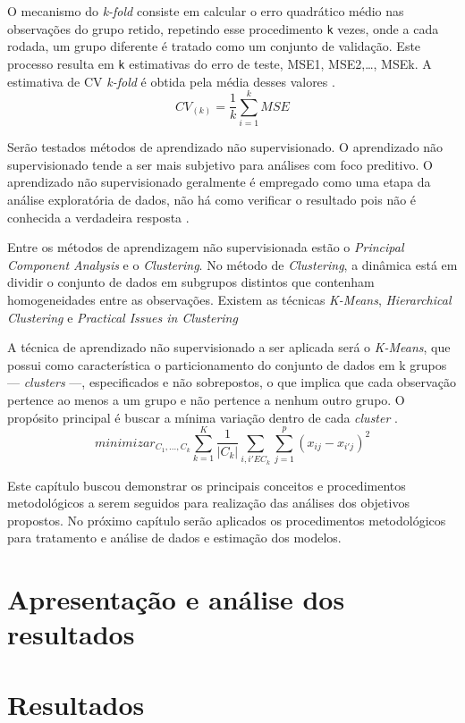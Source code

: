\documentclass[12pt,12pt,openright,oneside,a4paper,chapter=TITLE,section=TITLE,subsection=TITLE,subsubsection=TITLE,english,french,spanish,portugues,sumario=tradicional]{abntex2}
\begin{document}
O mecanismo do \emph{k-fold} consiste em calcular o erro quadrático médio nas observações do grupo retido, repetindo esse procedimento \texttt{k} vezes, onde a cada rodada, um grupo diferente é tratado como um conjunto de validação. Este processo resulta em \texttt{k} estimativas do erro de teste, MSE1, MSE2,\ldots{}, MSEk. A estimativa de CV \emph{k-fold} é obtida pela média desses valores \cite{gareth:2017}.
\[
CV_{(k)} = \frac{1}{k}\sum_{i=1}^{k}MSE  
\]

Serão testados métodos de aprendizado não supervisionado. O aprendizado não supervisionado tende a ser mais subjetivo para análises com foco preditivo. O aprendizado não supervisionado geralmente é empregado como uma etapa da análise exploratória de dados, não há como verificar o resultado pois não é conhecida a verdadeira resposta \cite{gareth:2017}.

Entre os métodos de aprendizagem não supervisionada estão o \emph{Principal Component Analysis} e o \emph{Clustering}. No método de \emph{Clustering}, a dinâmica está em dividir o conjunto de dados em subgrupos distintos que contenham homogeneidades entre as observações. Existem as técnicas \emph{K-Means}, \emph{Hierarchical Clustering} e \emph{Practical Issues in Clustering} \cite{gareth:2017}

A técnica de aprendizado não supervisionado a ser aplicada será o \emph{K-Means}, que possui como característica o particionamento do conjunto de dados em k grupos --- \emph{clusters} ---, especificados e não sobrepostos, o que implica que cada observação pertence ao menos a um grupo e não pertence a nenhum outro grupo. O propósito principal é buscar a mínima variação dentro de cada \emph{cluster} \cite{gareth:2017}.
\[
minimizar_{C_1,...,C_k} \sum_{k = 1}^{K}\frac{1}{|C_k|}\sum_{i,i' E C_k} \sum_{j=1}^{p}(x_{ij} - x_{i'j})^2 
\]

Este capítulo buscou demonstrar os principais conceitos e procedimentos metodológicos a serem seguidos para realização das análises dos objetivos propostos. No próximo capítulo serão aplicados os procedimentos metodológicos para tratamento e análise de dados e estimação dos modelos.

\chapter{Apresentação e análise dos resultados}

\chapter{Resultados}
\end{document}
